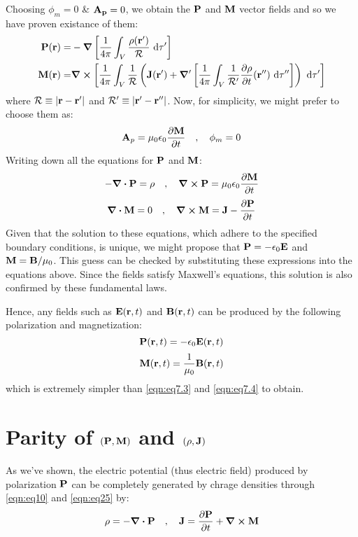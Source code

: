 \documentclass{article}
\numberwithin{equation}{section}
\begin{document}
Choosing $\phi_m=0$ \& $\vb{A_p}=0$, we obtain the $\vb{P}$ and $\vb{M}$ vector fields and so we have proven existance of them:
\begin{align}
\vb{P}(\vb{r})=&-\grad\left[\frac{1}{4\pi}\int_V\frac{\rho(\vb{r}')}{\mathcal{R}}\ \dd\tau'\right]\label{eqn:eq7.3}\\
\vb{M}(\vb{r})=&\curl\left[\frac{1}{4\pi}\int_V\frac{1}{\mathcal{R}}\left(\vb{J}(\vb{r}')+\grad'\left[\frac{1}{4\pi}\int_V\frac{1}{\mathcal{R}'}\frac{\partial \rho}{\partial t}(\vb{r}'')\ \dd\tau''\right]\right)\ \dd\tau'\right]\label{eqn:eq7.4}
\end{align}
where $\mathcal{R}\equiv|\vb{r}-\vb{r}'|$ and $\mathcal{R}'\equiv|\vb{r}'-\vb{r}''|$. Now, for simplicity, we might prefer to choose them as:
$$\vb{A}_p=\mu_0\epsilon_0\frac{\partial\vb{M}}{\partial t}\quad,\quad\phi_m=0$$
Writing down all the equations for $\vb{P}$ and $\vb{M}$:
$$-\div\vb{P}=\rho\quad,\quad\curl\vb{P}=\mu_0\epsilon_0\frac{\partial\vb{M}}{\partial t}$$
$$\div\vb{M}=0\quad,\quad\curl\vb{M}=\vb{J}-\frac{\partial\vb{P}}{\partial t}$$
Given that the solution to these equations, which adhere to the specified boundary conditions, is unique, we might propose that $\vb{P} = -\epsilon_0 \vb{E}$ and $\vb{M} = \vb{B} / \mu_0$. This guess can be checked by substituting these expressions into the equations above. Since the fields satisfy Maxwell's equations, this solution is also confirmed by these fundamental laws.


Hence, any fields such as $\vb{E}(\vb{r},t)$ and $\vb{B}(\vb{r},t)$ can be produced by the following polarization and magnetization:
$$\vb{P}(\vb{r},t)=-\epsilon_0\vb{E}(\vb{r},t)$$
$$\vb{M}(\vb{r},t)=\frac{1}{\mu_0}\vb{B}(\vb{r},t)$$
which is extremely simpler than \eqref{eqn:eq7.3} and \eqref{eqn:eq7.4} to obtain.


\section{Parity of $(\vb{P},\vb{M})$ and $(\rho,\vb{J})$}
As we've shown, the electric potential (thus electric field) produced by polarization $\vb{P}$ can be completely generated by chrage densities through \eqref{eqn:eq10} and \eqref{eqn:eq25} by:
$$\rho=-\div\vb{P}\quad,\quad\vb{J}=\frac{\partial\vb{P}}{\partial t}+\curl\vb{M}$$
\end{document}
